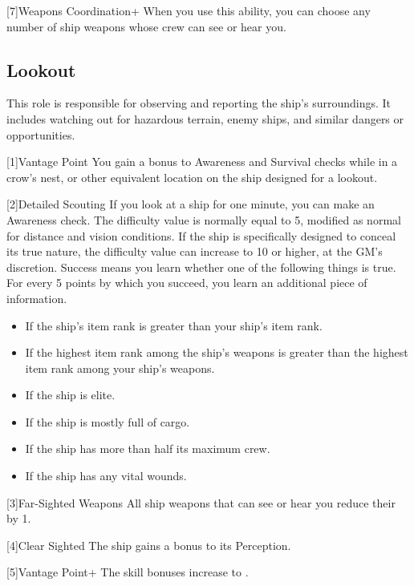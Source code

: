         [7]{Weapons Coordination+} When you use this ability, you can choose any number of ship weapons whose crew can see or hear you.

    \subsection{Lookout}
        This role is responsible for observing and reporting the ship's surroundings.
        It includes watching out for hazardous terrain, enemy ships, and similar dangers or opportunities.

        [1]{Vantage Point} You gain a  bonus to Awareness and Survival checks while in a crow's nest, or other equivalent location on the ship designed for a lookout.

        [2]{Detailed Scouting} If you look at a ship for one minute, you can make an Awareness check.
        The difficulty value is normally equal to 5, modified as normal for distance and vision conditions.
        If the ship is specifically designed to conceal its true nature, the difficulty value can increase to 10 or higher, at the GM's discretion.
        Success means you learn whether one of the following things is true.
        For every 5 points by which you succeed, you learn an additional piece of information.
        \begin{itemize}
            \item If the ship's item rank is greater than your ship's item rank.
            \item If the highest item rank among the ship's weapons is greater than the highest item rank among your ship's weapons.
            \item If the ship is elite.
            \item If the ship is mostly full of cargo.
            \item If the ship has more than half its maximum crew.
            \item If the ship has any vital wounds.
        \end{itemize}

        [3]{Far-Sighted Weapons} All ship weapons that can see or hear you reduce their  by 1.

        [4]{Clear Sighted} The ship gains a  bonus to its Perception.

        [5]{Vantage Point+} The skill bonuses increase to .

